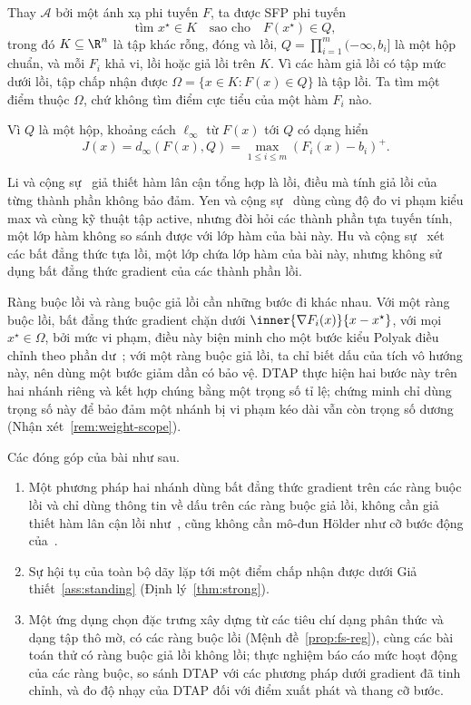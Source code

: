 Thay $\mathcal A$ bởi một ánh xạ phi tuyến $F$, ta được SFP phi tuyến~\citep{li2013nsfp,yen2019}
\begin{equation}\label{eq:nsfp-intro}
\text{tìm }x^\star\in K\quad\text{sao cho}\quad F(x^\star)\in Q,
\end{equation}
trong đó $K\subseteq\R^n$ là tập khác rỗng, đóng và lồi, $Q=\prod_{i=1}^m(-\infty,b_i]$ là một hộp chuẩn, và mỗi $F_i$ khả vi, lồi hoặc giả lồi trên $K$. Vì các hàm giả lồi có tập mức dưới lồi, tập chấp nhận được $\Omega=\{x\in K:F(x)\in Q\}$ là tập lồi. Ta tìm một điểm thuộc $\Omega$, chứ không tìm điểm cực tiểu của một hàm $F_i$ nào.

Vì $Q$ là một hộp, khoảng cách $\ell_\infty$ từ $F(x)$ tới $Q$ có dạng hiển
\[
J(x)=d_\infty(F(x),Q)=\max_{1\le i\le m}(F_i(x)-b_i)^+.
\]

Li và cộng sự~\citep{li2013nsfp} giả thiết hàm lân cận tổng hợp là lồi, điều mà tính giả lồi của từng thành phần không bảo đảm. Yen và cộng sự~\citep{yen2019} dùng cùng độ đo vi phạm kiểu max và cùng kỹ thuật tập active, nhưng đòi hỏi các thành phần tựa tuyến tính, một lớp hàm không so sánh được với lớp hàm của bài này. Hu và cộng sự~\citep{hu2022quasi} xét các bất đẳng thức tựa lồi, một lớp chứa lớp hàm của bài này, nhưng không sử dụng bất đẳng thức gradient của các thành phần lồi.

Ràng buộc lồi và ràng buộc giả lồi cần những bước đi khác nhau. Với một ràng buộc lồi, bất đẳng thức gradient chặn dưới $\inner{\nabla F_i(x)}{x-x^\star}$, với mọi $x^\star\in\Omega$, bởi mức vi phạm, điều này biện minh cho một bước kiểu Polyak điều chỉnh theo phần dư~\citep{polyak1969,lopez2012}; với một ràng buộc giả lồi, ta chỉ biết dấu của tích vô hướng này, nên dùng một bước giảm dần có bảo vệ. DTAP thực hiện hai bước này trên hai nhánh riêng và kết hợp chúng bằng một trọng số tỉ lệ; chứng minh chỉ dùng trọng số này để bảo đảm một nhánh bị vi phạm kéo dài vẫn còn trọng số dương (Nhận xét~\ref{rem:weight-scope}).

Các đóng góp của bài như sau.
\begin{enumerate}[label=\textbf{C\arabic*.},leftmargin=2.4em,itemsep=3pt]
\item Một phương pháp hai nhánh dùng bất đẳng thức gradient trên các ràng buộc lồi và chỉ dùng thông tin về dấu trên các ràng buộc giả lồi, không cần giả thiết hàm lân cận lồi như~\citep{li2013nsfp}, cũng không cần mô-đun H\"older như cỡ bước động của~\citep{hu2022quasi}.
\item Sự hội tụ của toàn bộ dãy lặp tới một điểm chấp nhận được dưới Giả thiết~\ref{ass:standing} (Định lý~\ref{thm:strong}).
\item Một ứng dụng chọn đặc trưng xây dựng từ các tiêu chí dạng phân thức và dạng tập thô mờ, có các ràng buộc lồi (Mệnh đề~\ref{prop:fs-reg}), cùng các bài toán thử có ràng buộc giả lồi không lồi; thực nghiệm báo cáo mức hoạt động của các ràng buộc, so sánh DTAP với các phương pháp dưới gradient đã tinh chỉnh, và đo độ nhạy của DTAP đối với điểm xuất phát và thang cỡ bước.
\end{enumerate}

